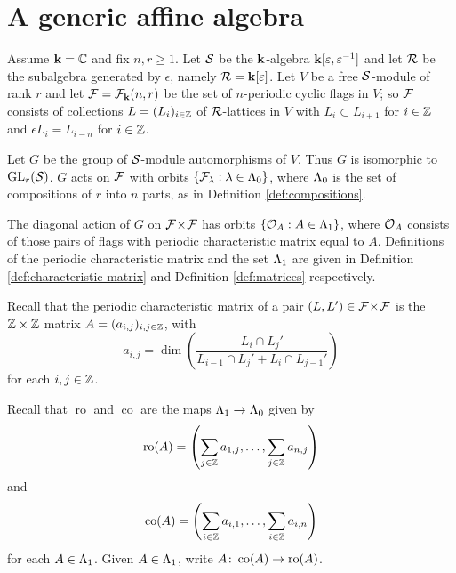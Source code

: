 \documentclass[a4paper, 11pt, twoside]{report}
\begin{document}
\chapter{A generic affine algebra}\label{chapter:generic-affine-algebra}


Assume $\mathbf{k} = \mathbb{C}$ and fix $n,r\geq 1$. Let $\mathcal{S}$ be the $\mathbf{k}$-algebra $\mathbf{k}[\varepsilon,\varepsilon^{-1}]$ and let $\mathcal{R}$ be the subalgebra generated by $\epsilon$, namely $\mathcal{R}=\mathbf{k}[\varepsilon]$. Let $V$ be a free $\mathcal{S}$-module of rank $r$ and let $\mathcal{F} = \mathcal{F}_{\mathbf{k}}(n,r)$ be the set of $n$-periodic cyclic flags in $V$; so $\mathcal{F}$ consists of collections $L = (L_i)_{i\in\mathbb{Z}}$ of $\mathcal{R}$-lattices in $V$ with $L_i\subset L_{i+1}$ for $i\in\mathbb{Z}$ and $\epsilon L_i = L_{i-n}$ for $i\in\mathbb{Z}$.

Let $G$ be the group of $\mathcal{S}$-module automorphisms of $V$. Thus $G$ is isomorphic to $\operatorname{GL}_{r}(\mathcal{S})$. $G$ acts on $\mathcal{F}$ with orbits $\{\mathcal{F}_\lambda:\lambda\in\Lambda_0{}\}$, where $\Lambda_0{}$ is the set of compositions of $r$ into $n$ parts, as in Definition \ref{def:compositions}.

The diagonal action of $G$ on ${\mathcal{F}\!\times\!\mathcal{F}}$ has orbits $\{\mathcal{O}_{A}:A\in\Lambda_1{}\}$, where $\mathcal{O}_{A}$ consists of those pairs of flags with periodic characteristic matrix equal to $A$. Definitions of the periodic characteristic matrix and the set $\Lambda_1{}$ are given in Definition \ref{def:characteristic-matrix} and Definition \ref{def:matrices} respectively.

Recall that the periodic characteristic matrix of a pair $(L,L')\in{\mathcal{F}\!\times\!\mathcal{F}}$ is the $\mathbb{Z}\times\mathbb{Z}$ matrix $A = (a_{i,j})_{i,j\in\mathbb{Z}}$, with
\begin{equation*}
a_{i,j} = \dim\left(\frac{L_i\cap L_j'}{L_{i-1}\cap L_j' + L_i\cap L_{j-1}'}\right)
\end{equation*}
for each $i,j\in\mathbb{Z}$.

Recall that $\operatorname{ro}$ and $\operatorname{co}$ are the maps $\Lambda_1{}\to\Lambda_0{}$ given by
\begin{equation*}
\operatorname{ro}(A) = \left(\sum_{j\in\mathbb{Z}} a_{1,j},\ldots, \sum_{j\in\mathbb{Z}}a_{n,j}\right)
\end{equation*}
and
\begin{equation*}
\operatorname{co}(A) = \left(\sum_{i\in\mathbb{Z}} a_{i,1},\ldots, \sum_{i\in\mathbb{Z}} a_{i,n}\right)
\end{equation*}
for each $A\in\Lambda_1{}$. Given $A\in\Lambda_1{}$, write $A\colon\operatorname{co}(A)\to\operatorname{ro}(A)$.
\end{document}
